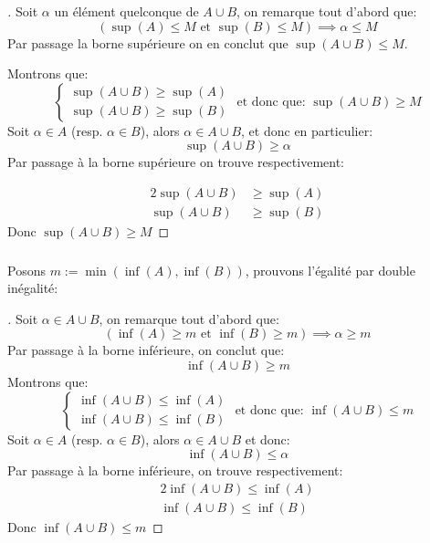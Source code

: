 \begin{proof}[\unskip\nopunct]
   \boxed{\leq} Soit \(\alpha\) un élément quelconque de \(A \cup B\), on remarque tout d'abord que:
   \[
      (\sup(A) \leq M \text{ et } \sup(B) \leq M) \implies \alpha \leq M
   \]
   Par passage la borne supérieure on en conclut que \(\sup(A \cup B)\leq M \).\<

   \boxed{\geq} Montrons que:
   \[
      \begin{cases}
         \sup(A \cup B) \geq \sup(A)\\
         \sup(A \cup B) \geq \sup(B)
      \end{cases} \text{ et donc que: \(\sup(A \cup B) \geq M\)}
   \]
   Soit \(\alpha \in A\) (resp. \(\alpha \in B\)), alors \(\alpha \in A \cup B\), et donc en particulier:
   \[
      \sup(A \cup B) \geq \alpha 
   \]
   Par passage à la borne supérieure on trouve respectivement:

   \begin{alignat}{2}
      \sup(A \cup B) &\geq \sup(A) \\  
      \sup(A \cup B) &\geq \sup(B)   
   \end{alignat}
   Donc \(\sup(A \cup B) \geq M\) 

\end{proof}

\subsubsection*{}
Posons \(m := \min(\inf(A), \inf(B))\), prouvons l'égalité par double inégalité:

\begin{proof}[\unskip\nopunct]
   \boxed{\geq} Soit \(\alpha \in A \cup B\), on remarque tout d'abord que:
   \[
      (\inf(A) \geq m \text{ et } \inf(B) \geq m ) \implies \alpha \geq m
   \]
   Par passage à la borne inférieure, on conclut que:
   \[
      \inf(A \cup B) \geq m    
   \]
   \boxed{\leq} Montrons que:
   \[
      \begin{cases}
         \inf(A \cup B) \leq \inf(A) \\
         \inf(A \cup B) \leq \inf(B)
      \end{cases} \text{ et donc que: \(\inf(A \cup B) \leq m\)}
   \]
   Soit \(\alpha \in A\) (resp. \(\alpha \in B\)), alors \(\alpha \in A \cup B\) et donc:
   \[
         \inf(A \cup B) \leq \alpha
   \]
   Par passage à la borne inférieure, on trouve respectivement:
   \begin{alignat*}{2}
      \inf(A \cup B) \leq \inf(A)\\
      \inf(A \cup B) \leq \inf(B)
   \end{alignat*}
   Donc \( \inf(A \cup B) \leq m\)
\end{proof}

